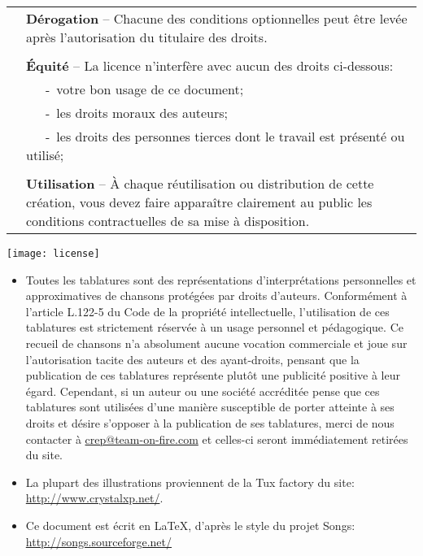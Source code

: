 \begin{tabular}{p{1cm} p{12cm}}
  \\
  & \textbf{Dérogation} -- 
  Chacune des conditions optionnelles peut être levée après l'autorisation du titulaire des droits.\\
  \\
  & \textbf{Équité} -- La licence n'interfère avec aucun des droits ci-dessous:\\
  & ~~~-~votre bon usage de ce document;\\
  & ~~~-~les droits moraux des auteurs;\\
  & ~~~-~les droits des personnes tierces dont le travail est présenté ou utilisé;\\
  \\
  & \textbf{Utilisation} -- À chaque réutilisation ou distribution de cette création, vous devez faire apparaître clairement au public les conditions contractuelles de sa mise à disposition.
\end{tabular}

\vspace{0.5cm}
\begin{center}
  \texttt{[image: license]}
\end{center}
\vspace{0.5cm}

\begin{itemize}
\item Toutes les tablatures sont des représentations d'interprétations
  personnelles et approximatives de chansons protégées par droits
  d'auteurs. Conformément à l'article L.122-5 du Code de la propriété
  intellectuelle, l'utilisation de ces tablatures est strictement
  réservée à un usage personnel et pédagogique. Ce recueil de chansons
  n'a absolument aucune vocation commerciale et joue sur
  l'autorisation tacite des auteurs et des ayant-droits, pensant que
  la publication de ces tablatures représente plutôt une publicité
  positive à leur égard. Cependant, si un auteur ou une société
  accréditée pense que ces tablatures sont utilisées d'une manière
  susceptible de porter atteinte à ses droits et désire s'opposer à la
  publication de ses tablatures, merci de nous contacter à
  \url{crep@team-on-fire.com} et celles-ci seront immédiatement
  retirées du site.
\item La plupart des illustrations proviennent de la Tux factory
  du site: \url{http://www.crystalxp.net/}.
\item Ce document est écrit en LaTeX, d'après le style du projet Songs: \url{http://songs.sourceforge.net/}
\end{itemize}


